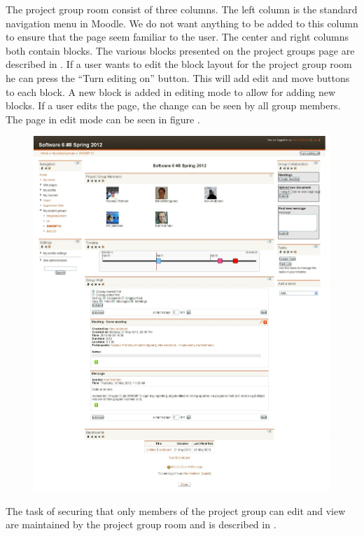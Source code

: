 The project group room consist of three columns. 
The left column is the standard navigation menu in Moodle. 
We do not want anything to be added to this column to ensure that the page seem familiar to the user.
The center and right columns both contain blocks.
The various blocks presented on the project groups page are described in . 
If a user wants to edit the block layout for the project group room he can press the ``Turn editing on'' button. 
This will add edit and move buttons to each block. 
A new block is added in editing mode to allow for adding new blocks. 
If a user edits the page, the change can be seen by all group members. 
The page in edit mode can be seen in figure .

\begin{figure}[h]
	\centering
		\includegraphics[width=\textwidth]{images/projectgroupwithedit.png}
	\label{fig:projectgroupwithedit}
\end{figure}


The task of securing that only members of the project group can edit and view are maintained by the project group room and is described in . 



